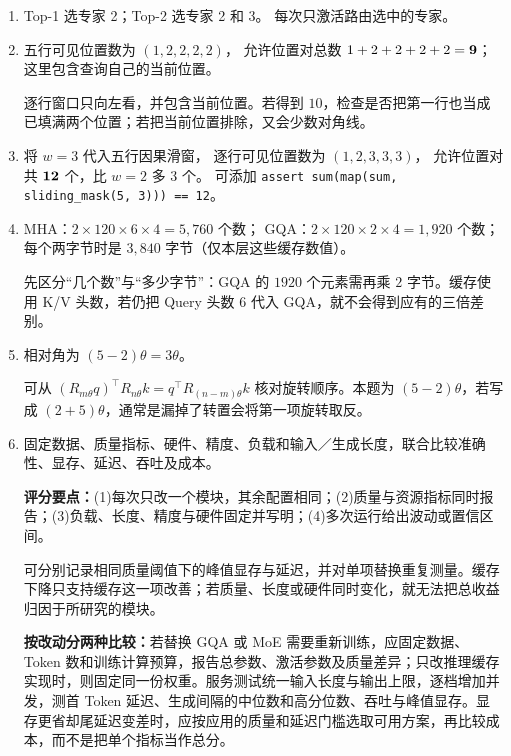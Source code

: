 \begin{enumerate}[label={},leftmargin=4.8em,itemsep=4pt]
\item[\textbf{\hyperref[exercise:moe-routing]{C-116.}}] \leavevmode{}\label{solution:C-116}\label{solution:moe-routing}Top-1 选专家 2；Top-2 选专家 2 和 3。
每次只激活路由选中的专家。
\item[\textbf{\hyperref[exercise:sliding-window-pairs]{C-117.}}] \leavevmode{}\label{solution:C-117}\label{solution:sliding-window-pairs}五行可见位置数为 $(1,2,2,2,2)$，
允许位置对总数 $1+2+2+2+2=\boldsymbol{9}$；
这里包含查询自己的当前位置。\par 逐行窗口只向左看，并包含当前位置。若得到 $10$，检查是否把第一行也当成已填满两个位置；若把当前位置排除，又会少数对角线。
\item[\textbf{\hyperref[exercise:sliding-window-code]{C-118.}}] \leavevmode{}\label{solution:C-118}\label{solution:sliding-window-code}将 $w=3$ 代入五行因果滑窗，
逐行可见位置数为 $(1,2,3,3,3)$，
允许位置对共 $\boldsymbol{12}$ 个，比 $w=2$ 多 $3$ 个。
可添加 \texttt{assert sum(map(sum, sliding\_mask(5, 3))) == 12}。
\item[\textbf{\hyperref[exercise:gqa-cache-ratio]{C-119.}}] \leavevmode{}\label{solution:C-119}\label{solution:gqa-cache-ratio}MHA：$2\times120\times6\times4=5{,}760$ 个数；
GQA：$2\times120\times2\times4=1{,}920$ 个数；
每个两字节时是 $3{,}840$ 字节（仅本层这些缓存数值）。\par 先区分“几个数”与“多少字节”：GQA 的 $1920$ 个元素需再乘 $2$ 字节。缓存使用 K/V 头数，若仍把 Query 头数 $6$ 代入 GQA，就不会得到应有的三倍差别。
\item[\textbf{\hyperref[exercise:rope-relative-position]{C-120.}}] \leavevmode{}\label{solution:C-120}\label{solution:rope-relative-position}相对角为 $(5-2)\theta=3\theta$。\par 可从 $(R_{m\theta}q)^\top R_{n\theta}k=q^\top R_{(n-m)\theta}k$ 核对旋转顺序。本题为 $(5-2)\theta$，若写成 $(2+5)\theta$，通常是漏掉了转置会将第一项旋转取反。
\item[\textbf{\hyperref[exercise:architecture-fair-comparison]{C-121.}}] \leavevmode{}\label{solution:C-121}\label{solution:architecture-fair-comparison}固定数据、质量指标、硬件、精度、负载和输入／生成长度，联合比较准确性、显存、延迟、吞吐及成本。\par\textbf{评分要点：}(1)每次只改一个模块，其余配置相同；(2)质量与资源指标同时报告；(3)负载、长度、精度与硬件固定并写明；(4)多次运行给出波动或置信区间。\par 可分别记录相同质量阈值下的峰值显存与延迟，并对单项替换重复测量。缓存下降只支持缓存这一项改善；若质量、长度或硬件同时变化，就无法把总收益归因于所研究的模块。\par\textbf{按改动分两种比较：}若替换 GQA 或 MoE 需要重新训练，应固定数据、Token 数和训练计算预算，报告总参数、激活参数及质量差异；只改推理缓存实现时，则固定同一份权重。服务测试统一输入长度与输出上限，逐档增加并发，测首 Token 延迟、生成间隔的中位数和高分位数、吞吐与峰值显存。显存更省却尾延迟变差时，应按应用的质量和延迟门槛选取可用方案，再比较成本，而不是把单个指标当作总分。
\end{enumerate}
